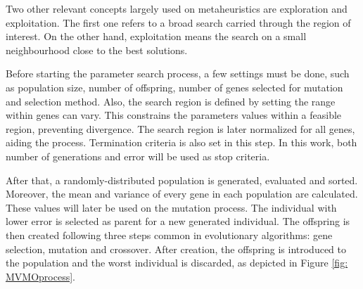 Two other relevant concepts largely used on metaheuristics are exploration and exploitation. The first one refers to a broad search carried through the region of interest. On the other hand, exploitation means the search on a small neighbourhood close to the best solutions.

Before starting the parameter search process, a few settings must be done, such as population size, number of offspring, number of genes selected for mutation and selection method. Also, the search region is defined by setting the range within genes can vary. This constrains the parameters values within a feasible region, preventing divergence. The search region is later normalized for all genes, aiding the process. Termination criteria is also set in this step. In this work, both number of generations and error will be used as stop criteria.

After that, a randomly-distributed population is generated, evaluated and sorted. Moreover, the mean and variance of every gene in each population are calculated. These values will later be used on the mutation process. The individual with lower error is selected as parent for a new generated individual. The offspring is then created following three steps common in evolutionary algorithms: gene selection, mutation and crossover. After creation, the offspring is introduced to the population and the worst individual is discarded, as depicted in Figure \ref{fig: MVMOprocess}.

